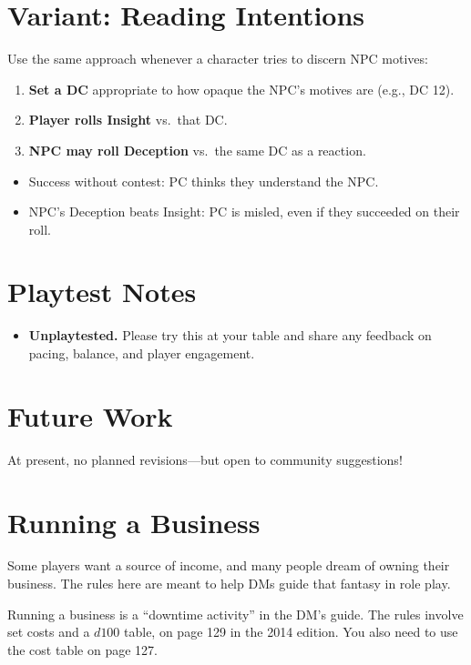 \documentclass[twocolumn]{dndbook}
\begin{document}
\section{Variant: Reading Intentions}
Use the same approach whenever a character tries to discern NPC motives:
\begin{enumerate}
  \item \textbf{Set a DC} appropriate to how opaque the NPC’s motives are (e.g., DC 12).
  \item \textbf{Player rolls Insight} vs.\ that DC.
  \item \textbf{NPC may roll Deception} vs.\ the same DC as a reaction.
\end{enumerate}
\begin{itemize}
  \item Success without contest: PC thinks they understand the NPC.
  \item NPC’s Deception beats Insight: PC is misled, even if they succeeded on their roll.
\end{itemize}

\section{Playtest Notes}
\begin{itemize}
  \item \textbf{Unplaytested.} Please try this at your table and share any feedback on pacing, balance, and player engagement.
\end{itemize}

\section{Future Work}
At present, no planned revisions—but open to community suggestions!

\section{Running a Business}

\begin{emphasisParagraph}
	Some players want a source of income,
	and many people dream of owning their business.
	The rules here are meant to help DMs guide
	that fantasy in role play.
\end{emphasisParagraph}


Running a business is a ``downtime activity'' in the DM's guide.
The rules involve set costs and a $d100$ table, on page 129 in the 2014 edition.
You also need to use the cost table on page 127.\par
\end{document}
